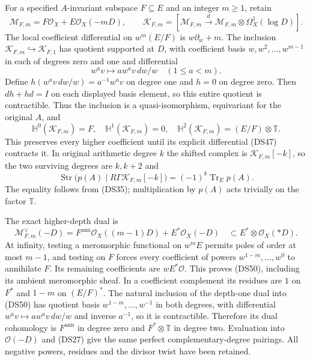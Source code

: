 For a specified $A$-invariant subspace $F\subseteq E$ and an integer
$m\geq1$, retain
\[
 \mathcal M_{F,m}=F\mathcal O_X+E\mathcal O_X(-mD),\qquad
 \mathscr K_{F,m}=[\mathcal M_{F,m}\xrightarrow d
  \mathcal M_{F,m}\otimes\Omega_X^1(\log D)].
 \tag{DS46}
\]
The local coefficient differential on $w^m(E/F)$ is
$w\partial_w+m$.  The inclusion $\mathscr K_{F,m}\hookrightarrow
\mathscr K_{F,1}$ has quotient supported at $D$, with coefficient
basis $w,w^2,\ldots,w^{m-1}$ in each of degrees zero and one and
differential
\[
 w^a v\longmapsto a w^a v\,dw/w\quad(1\leq a<m).
 \tag{DS47}
\]
Define $h(w^av\,dw/w)=a^{-1}w^av$ on degree one and $h=0$ on
degree zero.  Then $dh+hd=I$ on each displayed basis element, so
this entire quotient is contractible.  Thus the inclusion is a
quasi-isomorphism, equivariant for the original $A$, and
\[
 \mathbb H^0(\mathscr K_{F,m})=F,\quad
 \mathbb H^1(\mathscr K_{F,m})=0,\quad
 \mathbb H^2(\mathscr K_{F,m})=(E/F)\otimes\mathbb T.
 \tag{DS48}
\]
This preserves every higher coefficient until its explicit
differential (DS47) contracts it.  In original arithmetic degree $k$
the shifted complex is $\mathscr K_{F,m}[-k]$, so the two surviving
degrees are $k,k+2$ and
\[
 \operatorname{Str}\bigl(p(A)\mid R\Gamma\mathscr K_{F,m}[-k]\bigr)
 =(-1)^k\operatorname{Tr}_E p(A).
 \tag{DS49}
\]
The equality follows from (DS35); multiplication by $p(A)$ acts
trivially on the factor $\mathbb T$.

The exact higher-depth dual is
\[
 \mathcal M_{F,m}^\vee(-D)
 =F^{\mathrm{ann}}\mathcal O_X((m-1)D)
   +E^*\mathcal O_X(-D)
 \quad\subset E^*\otimes\mathcal O_X(*D).
 \tag{DS50}
\]
At infinity, testing a meromorphic functional on $w^mE$ permits
poles of order at most $m-1$, and testing on $F$ forces every
coefficient of powers $w^{1-m},\ldots,w^0$ to annihilate $F$.
Its remaining coefficients are $wE^*\mathcal O$.  This proves
(DS50), including its ambient meromorphic sheaf.  In a coefficient
complement its residues are $1$ on $F^*$ and $1-m$ on
$(E/F)^*$.  The natural inclusion of the depth-one dual into
(DS50) has quotient basis $w^{1-m},\ldots,w^{-1}$ in both degrees,
with differential $w^av\mapsto a w^av\,dw/w$ and inverse
$a^{-1}$, so it is contractible.  Therefore its dual cohomology is
$F^{\mathrm{ann}}$ in degree zero and $F^*\otimes\mathbb T$ in
degree two.  Evaluation into $\mathcal O(-D)$ and (DS27) give
the same perfect complementary-degree pairings.  All negative
powers, residues and the divisor twist have been retained.

